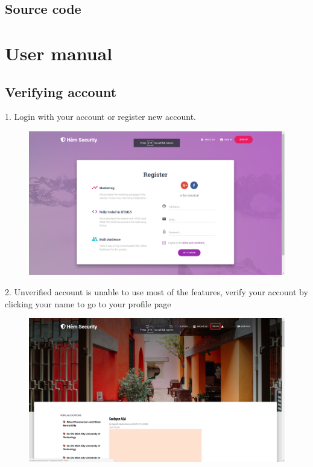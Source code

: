 \section{Source code}
\chapter{User manual}
\section{Verifying account}
1. Login with your account or register new account. 
\begin{center}
    \begin{figure}[H]
    \centering
    \includegraphics[width=1\columnwidth]{images/chap6/instruction1.png}
    \label{}
    \end{figure}
\end{center}
2. Unverified account is unable to use most of the features, verify your account by clicking your name to go to your profile page
\begin{center}
    \begin{figure}[H]
    \centering
    \includegraphics[width=1\columnwidth]{images/chap6/instruction2.png}
    \end{figure}
\end{center}
